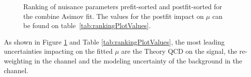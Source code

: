\begin{figure}[h]
  \centering
  \caption{Ranking of nuisance parameters prefit-sorted and postfit-sorted for the combine Asimov fit. The values for the postfit impact on $\mu$ can be found on table~\ref{tab:rankingPlotValues}. }
  \label{fig:fit:rankCombineStep0}
\end{figure}

As shown in Figure \ref{fig:fit:rankCombineStep0} and Table \ref{tab:rankingPlotValues},
the most leading uncertainties impacting on the fitted $\mu$ are
the Theory QCD on the signal, the re-weighting in the \tlep channel 
and the modeling uncertainty of the \Zjets background in the \tlep channel.

\clearpage

